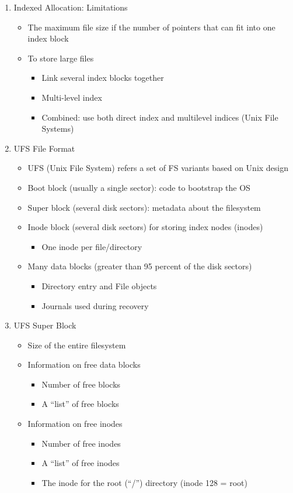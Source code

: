\documentclass[11pt]{article}
\begin{document}
\begin{enumerate}
\item Indexed Allocation: Limitations
	\begin{itemize}
  	\item The maximum file size if the number of pointers that can fit into one index block
  	\item To store large files
		\begin{itemize}
  		\item Link several index blocks together
  		\item Multi-level index
  		\item Combined: use both direct index and multilevel indices (Unix File Systems)
		\end{itemize}  
	\end{itemize}
	
\item UFS File Format
	\begin{itemize}
  	\item UFS (Unix File System) refers a set of FS variants based on Unix design
  	\item Boot block (usually a single sector): code to bootstrap the OS
  	\item Super block (several disk sectors): metadata about the filesystem
  	\item Inode block (several disk sectors) for storing index nodes (inodes)
  		\begin{itemize}
  		\item One inode per file/directory
  		\end{itemize}
  	\item Many data blocks (greater than 95 percent of the disk sectors)
  		\begin{itemize}
  		\item Directory entry and File objects
  		\item Journals used during recovery
  		\end{itemize}
	\end{itemize}
	
\item UFS Super Block
	\begin{itemize}
	\item Size of the entire filesystem
	\item Information on free data blocks
		\begin{itemize}
		\item Number of free blocks
		\item A “list” of free blocks
		\end{itemize}
	\item Information on free inodes
		\begin{itemize}
		\item Number of free inodes
		\item A “list” of free inodes
		\item The inode for the root (“/”) directory (inode 128 = root)
		\end{itemize}
	\end{itemize}
	

\end{enumerate}
\end{document}
